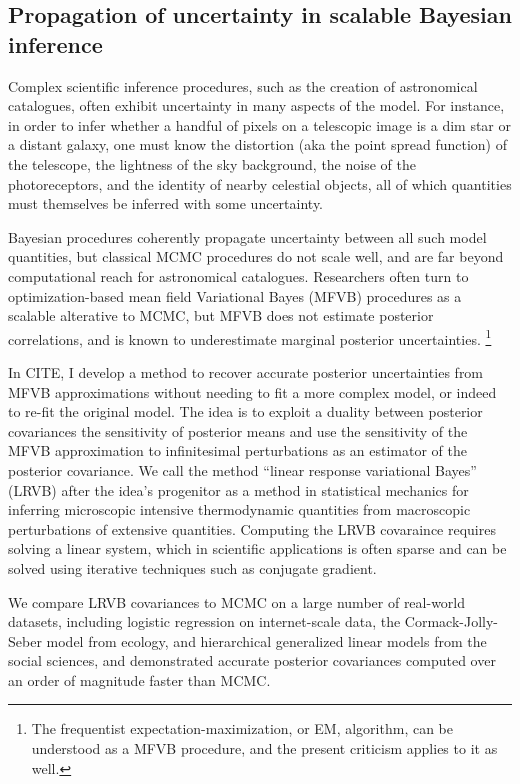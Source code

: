 \subsection{Propagation of uncertainty in scalable Bayesian inference}

Complex scientific inference procedures, such as the creation of astronomical
catalogues, often exhibit uncertainty in many aspects of the model.  For
instance, in order to infer whether a handful of pixels on a telescopic image is
a dim star or a distant galaxy, one must know the distortion (aka the point
spread function) of the telescope, the lightness of the sky background, the
noise of the photoreceptors, and the identity of nearby celestial objects, all
of which quantities must themselves be inferred with some uncertainty.

Bayesian procedures coherently propagate uncertainty between all such model
quantities, but classical MCMC procedures do not scale well, and are far beyond
computational reach for astronomical catalogues.  Researchers often turn to
optimization-based mean field Variational Bayes (MFVB) procedures as a scalable
alterative to MCMC, but MFVB does not estimate posterior correlations, and is
known to underestimate marginal posterior uncertainties.
\footnote{The frequentist expectation-maximization, or EM, algorithm,
can be understood as a MFVB procedure, and the present criticism applies
to it as well.}

In CITE, I develop a method to recover accurate posterior uncertainties from
MFVB approximations without needing to fit a more complex model, or indeed to
re-fit the original model.  The idea is to exploit a duality between posterior
covariances the sensitivity of posterior means and use the sensitivity of the
MFVB approximation to infinitesimal perturbations as an estimator of the
posterior covariance.  We call the method ``linear response variational Bayes''
(LRVB) after the idea's progenitor as a method in statistical mechanics for
inferring microscopic intensive thermodynamic quantities from macroscopic
perturbations of extensive quantities.  Computing the LRVB covaraince requires
solving a linear system, which in scientific applications is often sparse and
can be solved using iterative techniques such as conjugate gradient.

We compare LRVB covariances to MCMC on a large number of real-world datasets,
including logistic regression on internet-scale data, the Cormack-Jolly-Seber
model from ecology, and hierarchical generalized linear models from the
social sciences, and demonstrated accurate posterior covariances computed
over an order of magnitude faster than MCMC.


